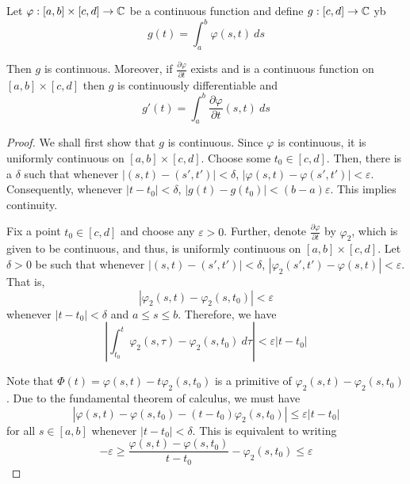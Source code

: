 \begin{theorem}
    Let $\varphi: [a,b]\times[c,d]\to\mathbb{C}$ be a continuous function and define $g:[c,d]\to\mathbb{C}$ yb 
    \begin{equation*}
        g(t) = \int_a^b \varphi(s,t)~ds
    \end{equation*}

    Then $g$ is continuous. Moreover, if $\frac{\partial\varphi}{\partial t}$ exists and is a continuous function on $[a,b]\times[c,d]$ then $g$ is continuously differentiable and 
    \begin{equation*}
        g'(t) = \int_a^b\frac{\partial\varphi}{\partial t}(s,t)~ds
    \end{equation*}
\end{theorem}
\begin{proof}
    We shall first show that $g$ is continuous. Since $\varphi$ is continuous, it is uniformly continuous on $[a,b]\times[c,d]$. Choose some $t_0\in [c,d]$. Then, there is a $\delta$ such that whenever $|(s,t) - (s',t')| < \delta$, $|\varphi(s,t) - \varphi(s',t')| < \varepsilon$. Consequently, whenever $|t - t_0| < \delta$, $|g(t) - g(t_0)| < (b - a)\varepsilon$. This implies continuity.

    Fix a point $t_0\in [c,d]$ and choose any $\varepsilon > 0$. Further, denote $\frac{\partial\varphi}{\partial t}$ by $\varphi_2$, which is given to be continuous, and thus, is uniformly continuous on $[a,b]\times[c,d]$. Let $\delta > 0$ be such that whenever $|(s,t) - (s',t')| < \delta$, $|\varphi_2(s',t') - \varphi(s,t)| < \varepsilon$. That is, 
    \begin{equation*}
        |\varphi_2(s,t) - \varphi_2(s,t_0)| < \varepsilon
    \end{equation*}
    whenever $|t - t_0| < \delta$ and $a\le s\le b$. Therefore, we have 
    \begin{equation*}
        \left|\int_{t_0}^t\varphi_2(s,\tau) - \varphi_2(s,t_0)~d\tau\right| < \varepsilon|t - t_0|
    \end{equation*}

    Note that $\Phi(t) = \varphi(s,t) - t\varphi_2(s,t_0)$ is a primitive of $\varphi_2(s,t) - \varphi_2(s,t_0)$. Due to the fundamental theorem of calculus, we must have 
    \begin{equation*}
        \left|\varphi(s,t) - \varphi(s,t_0) - (t-t_0)\varphi_2(s,t_0)\right|\le\varepsilon|t - t_0|
    \end{equation*}
    for all $s\in [a,b]$ whenever $|t - t_0| < \delta$. This is equivalent to writing 
    \begin{equation*}
        -\varepsilon\ge\frac{\varphi(s,t) - \varphi(s, t_0)}{t - t_0} - \varphi_2(s,t_0)\le\varepsilon
    \end{equation*}


\end{proof}
